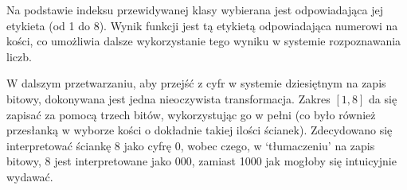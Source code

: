 Na podstawie indeksu przewidywanej klasy wybierana jest odpowiadająca jej etykieta (od 1 do 8).
Wynik funkcji jest tą etykietą odpowiadająca numerowi na kości,
co umożliwia dalsze wykorzystanie tego wyniku w systemie rozpoznawania liczb.

W dalszym przetwarzaniu, aby przejść z cyfr w systemie dziesiętnym na zapis bitowy, dokonywana jest jedna nieoczywista transformacja.
Zakres $[1, 8]$ da się zapisać za pomocą trzech bitów, wykorzystując go w pełni (co było również przesłanką w wyborze kości o dokładnie takiej ilości ścianek).
Zdecydowano się interpretować ściankę 8 jako cyfrę 0, wobec czego, w `tłumaczeniu' na zapis bitowy, 8 jest interpretowane jako 000, zamiast 1000 jak mogłoby się intuicyjnie wydawać.

